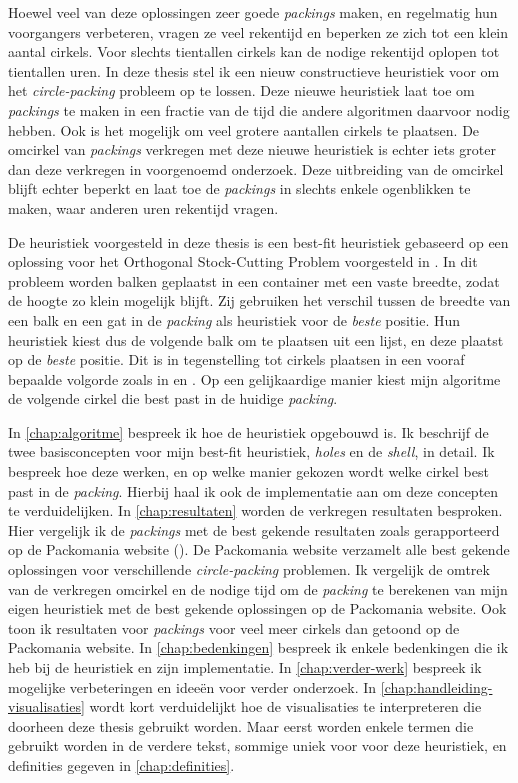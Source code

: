 \documentclass[12pt,a4paper,oneside]{book}
\begin{document}
Hoewel veel van deze oplossingen zeer goede \textit{packings} maken, en regelmatig hun voorgangers verbeteren, vragen ze veel rekentijd en beperken ze zich tot een klein aantal cirkels.
Voor slechts tientallen cirkels kan de nodige rekentijd oplopen tot tientallen uren.
In deze thesis stel ik een nieuw constructieve heuristiek voor om het \textit{circle-packing} probleem op te lossen.
Deze nieuwe heuristiek laat toe om \textit{packings} te maken in een fractie van de tijd die andere algoritmen daarvoor nodig hebben.
Ook is het mogelijk om veel grotere aantallen cirkels te plaatsen.
De omcirkel van \textit{packings} verkregen met deze nieuwe heuristiek is echter iets groter dan deze verkregen in voorgenoemd onderzoek.
Deze uitbreiding van de omcirkel blijft echter beperkt en laat toe de \textit{packings} in slechts enkele ogenblikken te maken, waar anderen uren rekentijd vragen.

De heuristiek voorgesteld in deze thesis is een best-fit heuristiek gebaseerd op een oplossing voor het Orthogonal Stock-Cutting Problem voorgesteld in \cite{burke2004new}.
In dit probleem worden balken geplaatst in een container met een vaste breedte, zodat de hoogte zo klein mogelijk blijft.
Zij gebruiken het verschil tussen de breedte van een balk en een gat in de \textit{packing} als heuristiek voor de \textit{beste} positie.
Hun heuristiek kiest dus de volgende balk om te plaatsen uit een lijst, en deze plaatst op de \textit{beste} positie.
Dit is in tegenstelling tot cirkels plaatsen in een vooraf bepaalde volgorde zoals in \cite{grosso2010} en \cite{jors2011}.
Op een gelijkaardige manier kiest mijn algoritme de volgende cirkel die best past in de huidige \textit{packing}.

In \autoref{chap:algoritme} bespreek ik hoe de heuristiek opgebouwd is.
Ik beschrijf de twee basisconcepten voor mijn best-fit heuristiek, \textit{holes} en de \textit{shell}, in detail.
Ik bespreek hoe deze werken, en op welke manier gekozen wordt welke cirkel best past in de \textit{packing}.
Hierbij haal ik ook de implementatie aan om deze concepten te verduidelijken.
In \autoref{chap:resultaten} worden de verkregen resultaten besproken.
Hier vergelijk ik de \textit{packings} met de best gekende resultaten zoals gerapporteerd op de Packomania website (\cite{packomania}).
De Packomania website verzamelt alle best gekende oplossingen voor verschillende \textit{circle-packing} problemen.
Ik vergelijk de omtrek van de verkregen omcirkel en de nodige tijd om de \textit{packing} te berekenen van mijn eigen heuristiek met de best gekende oplossingen op de Packomania website.
Ook toon ik resultaten voor \textit{packings} voor veel meer cirkels dan getoond op de Packomania website.
In \autoref{chap:bedenkingen} bespreek ik enkele bedenkingen die ik heb bij de heuristiek en zijn implementatie.
In \autoref{chap:verder-werk} bespreek ik mogelijke verbeteringen en ideeën voor verder onderzoek.
In \autoref{chap:handleiding-visualisaties} wordt kort verduidelijkt hoe de visualisaties te interpreteren die doorheen deze thesis gebruikt worden.
Maar eerst worden enkele termen die gebruikt worden in de verdere tekst, sommige uniek voor voor deze heuristiek, en definities gegeven in \autoref{chap:definities}.
\end{document}
